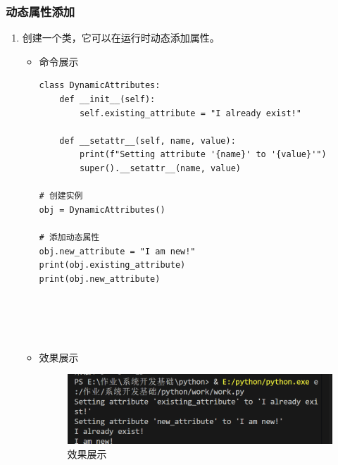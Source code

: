 \documentclass[UTF8]{ctexart}
\begin{document}
\subsubsection{动态属性添加}

\begin{enumerate}
  \item 创建一个类，它可以在运行时动态添加属性。
  \begin{itemize}
  \item 命令展示
  \begin{verbatim}
class DynamicAttributes:
    def __init__(self):
        self.existing_attribute = "I already exist!"

    def __setattr__(self, name, value):
        print(f"Setting attribute '{name}' to '{value}'")
        super().__setattr__(name, value)

# 创建实例
obj = DynamicAttributes()

# 添加动态属性
obj.new_attribute = "I am new!"
print(obj.existing_attribute)
print(obj.new_attribute)



    
  \end{verbatim}

  \item 效果展示
  \begin{figure}[H]
    \centering
    \includegraphics[width=\textwidth]{24} %
    \caption{效果展示}
  
  \end{figure}
\end{itemize}
\end{enumerate}
\end{document}
